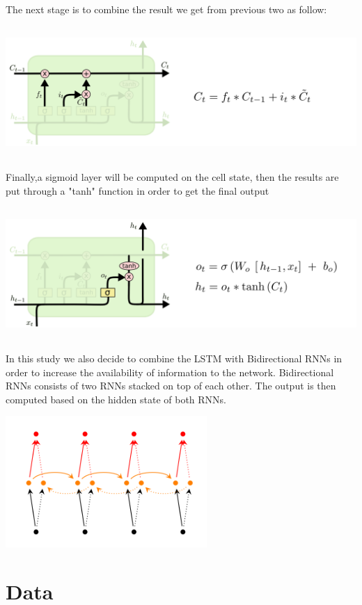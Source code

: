 \documentclass[a4paper,11pt]{article}
\begin{document}
The next stage is to combine the result we get from previous two as follow:

\includegraphics[height = 5cm]{ltsm3.png}

Finally,a sigmoid layer will be computed on the cell state, then the results are put through a "tanh" function in order to get the final output 

\includegraphics[height = 5cm]{ltsm4.png}

\noindent In this study we also decide to combine the LSTM with Bidirectional RNNs in order to increase the availability of information to the network. Bidirectional RNNs consists of two RNNs stacked on top of each other. The output is then computed based on the hidden state of both RNNs.


\includegraphics[height = 5cm]{figure3.png}

\section{Data}
\end{document}
